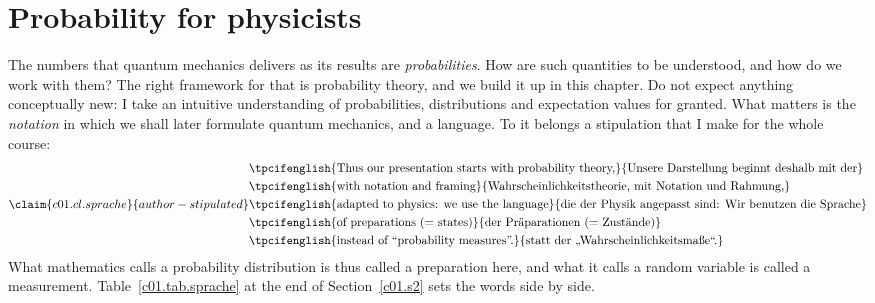 %

\chapter{Probability for physicists}\label{c01}

The numbers that quantum mechanics delivers as its results are \emph{probabilities}. How
are such quantities to be understood, and how do we work with them? The right framework for
that is probability theory, and we build it up in this chapter. Do not expect anything
conceptually new: I take an intuitive understanding of probabilities, distributions and
expectation values for granted. What matters is the \emph{notation} in which we shall later
formulate quantum mechanics, and a language. To it belongs a stipulation that I make for the
whole course:
\begin{equation}\label{c01.eq.sprache}\claim{c01.cl.sprache}{author-stipulated}
  \begin{aligned}
    &\text{\tpcifenglish{Thus our presentation starts with probability theory,}{Unsere Darstellung beginnt deshalb mit der}} \\
    &\text{\tpcifenglish{with notation and framing}{Wahrscheinlichkeitstheorie, mit Notation und Rahmung,}} \\
    &\text{\tpcifenglish{adapted to physics: we use the language}{die der Physik angepasst sind: Wir benutzen die Sprache}} \\
    &\text{\tpcifenglish{of preparations (= states)}{der Präparationen (= Zustände)}} \\
    &\text{\tpcifenglish{instead of “probability measures”.}{statt der „Wahrscheinlichkeitsmaße“.}}
  \end{aligned}
\end{equation}
What mathematics calls a probability distribution is thus called a preparation here, and
what it calls a random variable is called a measurement. Table~\ref{c01.tab.sprache} at the
end of Section~\ref{c01.s2} sets the words side by side.

